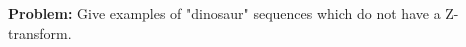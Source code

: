 \documentclass{article}
\begin{document}
\textbf{Problem:}
Give examples of "dinosaur" sequences which do not have a Z-transform.
\end{document}
